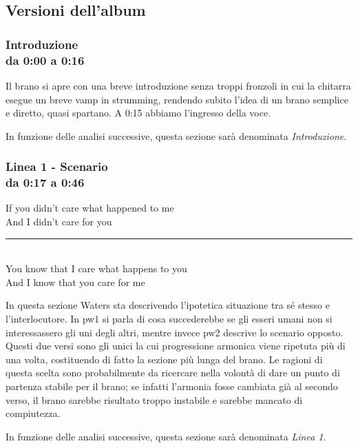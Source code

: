 \documentclass[class=book, crop=false, oneside, 12pt]{standalone}
\begin{document}
    \subsection{Versioni dell'album}
    
    \subsubsection*{Introduzione\\ \small{da 0:00 a 0:16}}
    Il brano si apre con una breve introduzione senza troppi fronzoli in cui la chitarra esegue un breve vamp in strumming, rendendo subito l'idea di un brano semplice e diretto, quasi spartano. A 0:15 abbiamo l'ingresso della voce.
    
    In funzione delle analisi successive, questa sezione sarà denominata \emph{Introduzione}.

    \subsubsection*{Linea 1 - Scenario\\ \small{da 0:17 a 0:46}}
    \begin{displayquote}
        If you didn't care what happened to me \\
        And I didn't care for you \\ 
        \vspace{0pt}
        \rule{.4\linewidth}{.5pt} \\ %
        You know that I care what happens to you \\
        And I know that you care for me 
    \end{displayquote}
    In questa sezione Waters sta descrivendo l'ipotetica situazione tra sé stesso e l'interlocutore. In \acrshort{pw1} si parla di cosa succederebbe se gli esseri umani non si interessassero gli uni degli altri, mentre invece \acrshort{pw2} descrive lo scenario opposto. Questi due versi sono gli unici la cui progressione armonica viene ripetuta più di una volta, costituendo di fatto la sezione più lunga del brano. Le ragioni di questa scelta sono probabilmente da ricercare nella volontà di dare un punto di partenza stabile per il brano; se infatti l'armonia fosse cambiata già al secondo verso, il brano sarebbe risultato troppo instabile e sarebbe mancato di compiutezza.

    In funzione delle analisi successive, questa sezione sarà denominata \emph{Linea 1}.
    
\end{document}
